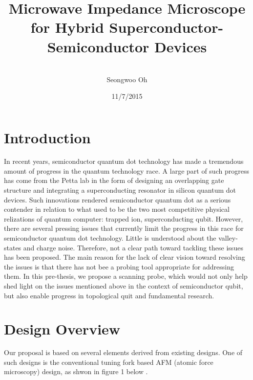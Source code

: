 \documentclass[11pt]{article}
\numberwithin{equation}{section}
\begin{document}
\title{\textbf{Microwave Impedance Microscope for Hybrid Superconductor-Semiconductor Devices}}
\author{\\Seongwoo Oh}
\date{11/7/2015}
\maketitle

\tableofcontents

\section{Introduction}
\hspace{\parindent}
In recent years, semiconductor quantum dot technology has made a tremendous amount of progress in the quantum technology race. A large part of such progress has come from the Petta lab in the form of designing an overlapping gate structure and integrating a superconducting resonator in silicon quantum dot devices.  Such innovations rendered semiconductor quantum dot as a serious contender in relation to what used to be the two most competitive physical relizations of quantum computer: trapped ion, superconducting qubit. However, there are several pressing issues that currently limit the progress in this race for semiconductor quantum dot technology.  Little is understood about the valley-states and charge noise.  
Therefore, not a clear path toward tackling these issues has been proposed.  The main reason for the lack of clear vision toward resolving the issues is that there has not bee a probing tool appropriate for addressing them.  In this pre-thesis, we propose a scanning probe, which would not only help shed light on the issues mentioned above in the context of semiconductor qubit, but also enable progress in topological quit and fundamental research.  


\section{Design Overview}
\hspace{\parindent}
Our proposal is based on several elements derived from existing designs.  One of such designs is the conventional tuning fork based AFM (atomic force microscopy) design, as shwon in figure 1 below \cite{zxsafm}. 
\end{document}

